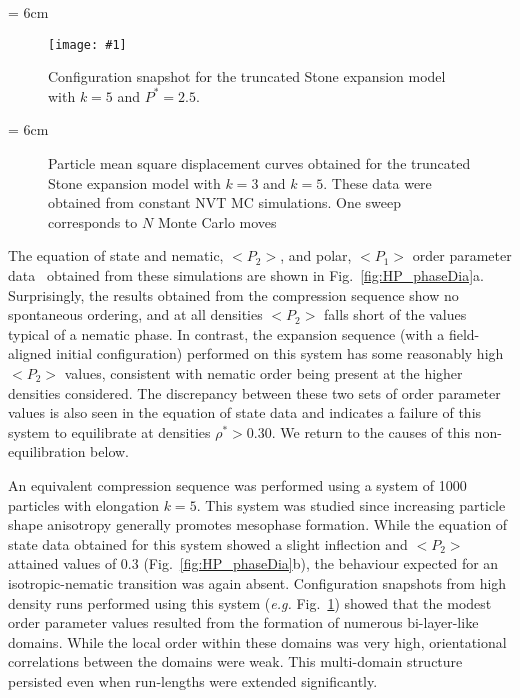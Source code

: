 \documentclass[%
reprint,
superscriptaddress,
showpacs,
 amsmath,amssymb,
 aps,
floatfix,
]{revtex4-1}
\newcommand{\pic}[1]{\texttt{[image: \#1]}}
\newcommand{\picL}[1]{\texttt{[image: \#1]}}
\newlength{\picW}
\begin{document}
\picW = 6cm
\begin{figure}
    \centering
    \pic{HP_box_NPT_k5_b_N1000_P2.5.ps}
    \caption{Configuration snapshot for the truncated Stone expansion model with $k=5$ and
    $P^{*}=2.5$.}
    \label{fig:HP_k5_snap}
\end{figure}

\picW = 6cm
\begin{figure*}
    \centering
    \subfigure[$k=3$]{\picL{HP_dc-t_NVT_N1000_k3_S1.ps}}
    \subfigure[$k=5$]{\picL{HP_dc-t_NVT_N1000_k5_S1.2.ps}}
    \caption{Particle mean square displacement curves obtained for the truncated Stone expansion model with
    $k=3$ and $k=5$. These data were obtained from constant NVT MC simulations.
    One sweep corresponds to $N$ Monte Carlo moves}
    \label{fig:HP_dc}
\end{figure*}

The equation of state and nematic, $<P_2>$, and polar, $<P_1>$ order parameter data~\cite{OP}
obtained from these simulations are shown in Fig.~\ref{fig:HP_phaseDia}a. Surprisingly, the
results obtained from the compression sequence show no spontaneous ordering, and at all
densities $<P_2>$ falls short of the values typical of a nematic phase. In contrast, the expansion
sequence (with a field-aligned initial configuration) performed on this system has some
reasonably high $<P_2>$ values, consistent with nematic order being present at the higher
densities considered. The discrepancy between these two sets of order parameter values is also
seen in the equation of state data and indicates a failure of this system to equilibrate at
densities $\rho^{*} > 0.30$. We return to the causes of this non-equilibration below.


An equivalent compression sequence was performed using a system of 1000 particles with
elongation $k=5$. This system was studied since increasing particle shape anisotropy generally
promotes mesophase formation. While the equation of state data obtained for this system showed a
slight inflection and $<P_2>$ attained values of 0.3 (Fig.~\ref{fig:HP_phaseDia}b), the behaviour
expected for an isotropic-nematic transition was again absent. Configuration snapshots from high
density runs performed using this system ({\em e.g.} Fig.~\ref{fig:HP_k5_snap}) showed that the
modest order parameter values resulted from the formation of numerous bi-layer-like domains.
While the local order within these domains was very high, orientational correlations between the
domains were weak. This multi-domain structure persisted even when run-lengths were extended
significantly.
\end{document}
